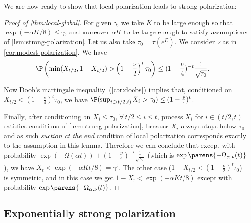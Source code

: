 \documentclass[11pt]{article}
\begin{document}
We are now ready to show that local polarization leads to strong polarization:
\begin{proof}[Proof of \cref{thm:local-global}]
	For given $\gamma$, we take $K$ to be large enough so that $\exp(- \alpha K/8) \le \gamma$, and moreover $\alpha K$ to be large enough to satisfy assumptions of \cref{lem:strong-polarization}. Let us also take $\tau_0 = \tau(e^K)$.
	We consider $\nu$ as in \cref{cor:modest-polarization}. We have
	\begin{align*}
		\P\left(\min(X_{t/2}, 1 - X_{t/2}) > \left(1 - \frac{\nu}{2}\right)^t \tau_0\right) &\leq (1 - \frac{\nu}{4})^{-t} \frac{1}{\sqrt{\tau_0}}.
	\end{align*}
	
	Now Doob's martingale inequality~(\cref{cor:doobs}) implies that, conditioned on $X_{t/2} < (1 - \frac{\nu}{4})^t \tau_0$, we have $\P(\sup_{i \in (t/2, t)} X_i > \tau_0) \leq (1 - \frac{\nu}{4})^t$.
	
	Finally, after conditioning on $X_i\le \tau_0$, $\forall\, {t/2 \leq i \leq t}$, process $X_i$ for $i \in (t/2, t)$ satisfies conditions
	of \cref{lem:strong-polarization}, because $X_i$ always stays below $\tau_0$ and as such \emph{suction at the end} condition of local polarization corresponds exactly to the assumption in this lemma. Therefore we can conclude that except with probability $\exp(-\Omega(\alpha t))+(1 - \frac{\nu}{4})^{-t} \frac{1}{\sqrt{\tau_0}}$ (which is $\exp\parens{-\Omega_{\alpha,\nu}(t)}$), we have $X_t < \exp(-\alpha K t / 8) = \gamma^t$.
	The other case ($1 - X_{t/2} < (1 - \frac{\nu}{2})^t \tau_0$) is symmetric, and in this case we get $1 - X_t < \exp(-\alpha K t / 8)$ except with probability $\exp\parens{- \Omega_{\alpha,\nu}( t)}$.
\end{proof}

\subsection{Exponentially strong polarization \label{sec:exp-local-to-global}}
\end{document}
